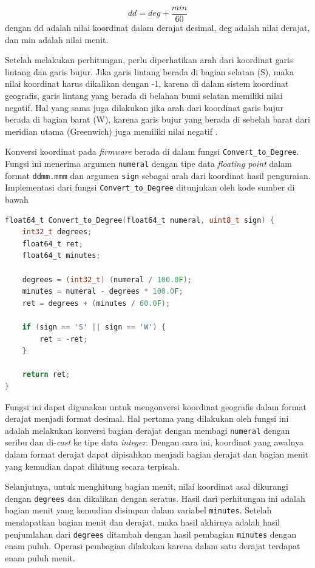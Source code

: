 \begin{equation}
	dd = deg + \frac{min}{60} 
\end{equation}
dengan dd adalah nilai koordinat dalam derajat desimal, deg adalah nilai derajat, dan min adalah nilai menit.

Setelah melakukan perhitungan, perlu diperhatikan arah dari koordinat garis lintang dan garis bujur. Jika garis lintang berada di bagian selatan (S), maka nilai koordinat harus dikalikan dengan -1, karena di dalam sistem koordinat geografis, garis lintang yang berada di belahan bumi selatan memiliki nilai negatif. Hal yang sama juga dilakukan jika arah dari koordinat garis bujur berada di bagian barat (W), karena garis bujur yang berada di sebelah barat dari meridian utama (Greenwich) juga memiliki nilai negatif \cite{AlHindawi2012}.

Konversi koordinat pada \textit{firmware} berada di dalam fungsi \texttt{Convert\_to\_Degree}. Fungsi ini menerima argumen \texttt{numeral} dengan tipe data \textit{floating point} dalam format \texttt{ddmm.mmm} dan argumen \texttt{sign} sebagai arah dari koordinat hasil penguraian. Implementasi dari fungsi \texttt{Convert\_to\_Degree} ditunjukan oleh kode sumber di bawah
\begin{lstlisting}[language=c]
float64_t Convert_to_Degree(float64_t numeral, uint8_t sign) {
	int32_t degrees;
	float64_t ret;
	float64_t minutes;
	
	degrees = (int32_t) (numeral / 100.0F);
	minutes = numeral - degrees * 100.0F;
	ret = degrees + (minutes / 60.0F);
	
	if (sign == 'S' || sign == 'W') {
		ret = -ret;
	}
	
	return ret;
}
\end{lstlisting}

Fungsi ini dapat digunakan untuk mengonversi koordinat geografis dalam format derajat menjadi format desimal. Hal pertama yang dilakukan oleh fungsi ini adalah melakukan konversi bagian derajat dengan membagi \texttt{numeral} dengan seribu dan di-\textit{cast} ke tipe data \textit{integer}. Dengan cara ini, koordinat yang awalnya dalam format derajat dapat dipisahkan menjadi bagian derajat dan bagian menit yang kemudian dapat dihitung secara terpisah.

Selanjutnya, untuk menghitung bagian menit, nilai koordinat asal dikurangi dengan \texttt{degrees} dan dikalikan dengan seratus. Hasil dari perhitungan ini adalah bagian menit yang kemudian disimpan dalam variabel \texttt{minutes}. Setelah mendapatkan bagian menit dan derajat, maka hasil akhirnya adalah hasil penjumlahan dari \texttt{degrees} ditambah dengan hasil pembagian \texttt{minutes} dengan enam puluh. Operasi pembagian dilakukan karena dalam satu derajat terdapat enam puluh menit.

